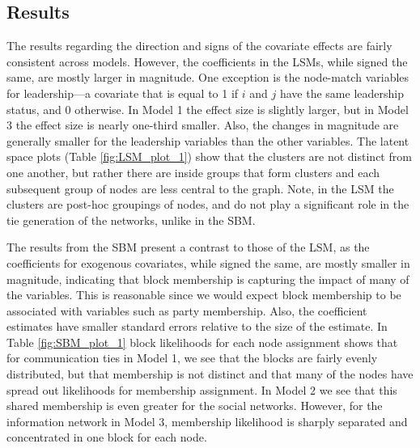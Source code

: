 \documentclass[fleqn,12pt]{wlscirep}
\begin{document}
\subsection{Results}


The results regarding the direction and signs of the covariate effects are fairly consistent across models. However, the coefficients in the LSMs, while signed the same, are mostly larger in magnitude. One exception is the node-match variables for leadership---a covariate that is equal to 1 if $i$ and $j$ have the same leadership status, and 0 otherwise. In Model 1 the effect size is slightly larger, but in Model 3 the effect size is nearly one-third smaller. Also, the changes in magnitude are generally smaller for the leadership variables than the other variables. The latent space plots (Table \ref{fig:LSM_plot_1}) show that the clusters are not distinct from one another, but rather there are inside groups that form clusters and each subsequent group of nodes are less central to the graph. Note, in the LSM the clusters are post-hoc groupings of nodes, and do not play a significant role in the tie generation of the networks, unlike in the SBM.

The results from the SBM present a contrast to those of the LSM, as the coefficients for exogenous covariates, while signed the same, are mostly smaller in magnitude, indicating that block membership is capturing the impact of many of the variables. This is reasonable since we would expect block membership to be associated with variables such as party membership. Also, the coefficient estimates have smaller standard errors relative to the size of the estimate. In Table \ref{fig:SBM_plot_1} block likelihoods for each node assignment shows that for communication ties in Model 1, we see that the blocks are fairly evenly distributed, but that membership is not distinct and that many of the nodes have spread out likelihoods for membership assignment. In Model 2 we see that this shared membership is even greater for the social networks. However, for the information network in Model 3, membership likelihood is sharply separated and concentrated in one block for each node. 
\end{document}
